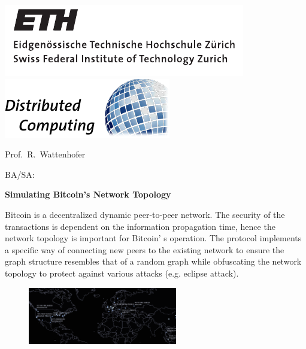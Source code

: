 \documentclass[a4paper,11pt]{article}
\begin{document}
\thispagestyle{empty}

\noindent
\hrulefill \vspace{6pt}

\noindent
\includegraphics[viewport=8 8 185 55]{figures/eth_logo_black} \hfill
\includegraphics[trim=0 0 2 0]{figures/disco-logo-col} \hspace{-6pt} \vspace{-6pt}

\noindent \hrulefill \vspace{4pt}

\hfill Prof.\ R.\ Wattenhofer

\noindent BA/SA: \bigskip

\noindent \textbf{\LARGE Simulating Bitcoin's Network Topology} \bigskip

\noindent Bitcoin is a decentralized dynamic peer-to-peer network. The security of the transactions is dependent on the information propagation time, hence the network topology is important for Bitcoin' s  operation. The protocol implements a specific way of connecting new peers to the existing network to ensure the graph structure resembles that of a random graph while obfuscating the network topology to protect against various attacks (e.g. eclipse attack).

\bigskip

\begin{figure}
	\vspace{-0.5cm}
	\includegraphics[width=6.5cm]{figures/bitcoin_topology.png}
\end{figure}
\end{document}
